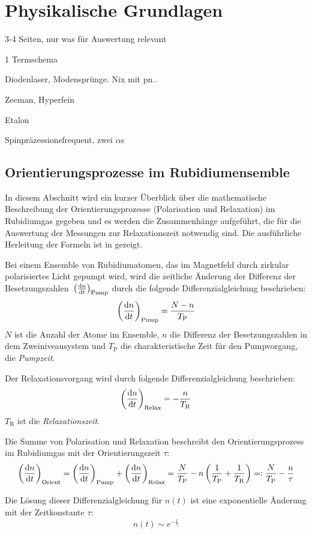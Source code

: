 \section{Physikalische Grundlagen}

3-4 Seiten, nur was für Auswertung relevant

1 Termschema

Diodenlaser, Modensprünge. Nix mit pn..

Zeeman, Hyperfein

Etalon

Spinpräzessionsfrequent, zwei $\alpha$s

\subsection{Orientierungsprozesse im Rubidiumensemble}
In diesem Abschnitt wird ein kurzer Überblick über die mathematische Beschreibung der Orientierungsprozesse
(Polarisation und Relaxation) im Rubidiumgas gegeben und es werden die Zusammenhänge aufgeführt, die für die
Auswertung der Messungen zur Relaxationszeit notwendig sind.
Die ausführliche Herleitung der Formeln ist in \cite{staatsex} gezeigt.

Bei einem Ensemble von Rubidiumatomen, das im Magnetfeld durch zirkular polarisiertes Licht gepumpt wird,
wird die zeitliche Änderung der Differenz der Besetzungszahlen~$\left(\frac{\mathrm{d} n}{\mathrm{d} t}\right)_{\text{Pump}}$
durch die folgende Differenzialgleichung beschrieben:
\begin{equation}
  \left(\frac{\mathrm{d} n}{\mathrm{d} t}\right)_{\text{Pump}}=\frac{N-n}{T_\text{P}}
\end{equation}
$N$ ist die Anzahl der Atome im Ensemble, $n$ die Differenz der Besetzungszahlen in dem Zweiniveausystem
und $T_\text{P}$ die charakteristische Zeit für den Pumpvorgang, die \emph{Pumpzeit}.

Der Relaxationsvorgang wird durch folgende Differenzialgleichung beschrieben:
\begin{equation}
  \left(\frac{\mathrm{d} n}{\mathrm{d} t}\right)_{\text{Relax}}=-\frac{n}{T_\text{R}}
\end{equation}
$T_\text{R}$ ist die \emph{Relaxationszeit}.

Die Summe von Polarisation und Relaxation beschreibt den Orientierungsprozess im Rubidiumgas mit
der Orientierungszeit $\tau$:
\begin{equation}
\label{eq:orientierungszeit}
  \left(\frac{\mathrm{d} n}{\mathrm{d} t}\right)_{\text{Orient}}
  =\left(\frac{\mathrm{d} n}{\mathrm{d} t}\right)_{\text{Pump}} + \left(\frac{\mathrm{d} n}{\mathrm{d} t}\right)_{\text{Relax}}
  =\frac{N}{T_\text{P}}-n \left( \frac{1}{T_\text{P}} + \frac{1}{T_\text{R}}\right)
  =:\frac{N}{T_\text{P}}- \frac{n}{\tau}
\end{equation}

Die Lösung dieser Differenzialgleichung für $n(t)$ ist eine exponentielle Änderung mit der Zeitkonstante $\tau$:
\begin{equation}
\label{eq:expabhorient}
   n(t) \sim e^{-\frac{t}{\tau}}
\end{equation}


